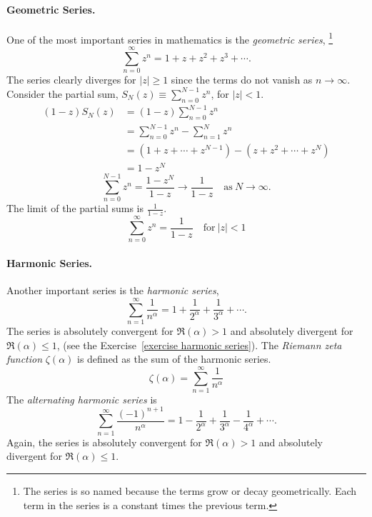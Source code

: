 \paragraph{Geometric Series.}
One of the most important series in mathematics is the 
\textit{geometric series},
\footnote{
  The series is so named because the terms grow or decay geometrically.  
  Each term in the series is a constant times the previous term.
  }
\[ 
\sum_{n = 0}^\infty z^n = 1 + z + z^2 + z^3 + \cdots.
\]
The series clearly diverges for $|z| \geq 1$ since the terms do not vanish
as $n \to \infty$.  Consider the partial sum,
$S_N(z) \equiv \sum_{n=0}^{N-1} z^n$, for $|z| < 1$.
\begin{align*}
  (1 - z) S_N(z) &= (1-z) \sum_{n=0}^{N-1} z^n 
  \\
  &= \sum_{n=0}^{N-1} z^n - \sum_{n=1}^{N} z^n 
  \\
  &= \left( 1 + z + \cdots + z^{N-1} \right) - \left( z + z^2 + \cdots + z^N \right) 
  \\
  &= 1 - z^N
\end{align*}
\[ 
\sum_{n=0}^{N-1} z^n = \frac{1 - z^N}{1-z} \to \frac{1}{1 - z} \quad \mathrm{as}\ N \to \infty.
\]
The limit of the partial sums is $\frac{1}{1-z}$.
\[ 
\sum_{n = 0}^\infty z^n = \frac{1}{1-z} \quad \mathrm{for}\ |z| < 1
\]





\paragraph{Harmonic Series.}
Another important series is the \textit{harmonic series}, 
\[ 
\sum_{n=1}^\infty \frac{1}{n^\alpha} = 1 + \frac{1}{2^\alpha} + \frac{1}{3^\alpha} + \cdots.
\]
The series is absolutely convergent for $\Re(\alpha) > 1$ and absolutely divergent
for $\Re(\alpha) \leq 1$, (see the Exercise~\ref{exercise harmonic series}).  The 
\textit{Riemann zeta function} $\zeta(\alpha)$ is 
defined as the sum of the harmonic series.
\[ 
\zeta(\alpha) = \sum_{n=1}^\infty \frac{1}{n^\alpha} 
\]
The \textit{alternating harmonic series} is
\[ 
\sum_{n=1}^\infty \frac{(-1)^{n+1}}{n^\alpha} = 1 - \frac{1}{2^\alpha} + \frac{1}{3^\alpha} - \frac{1}{4^\alpha} +  \cdots.
\]
Again, the series is absolutely convergent for $\Re(\alpha) > 1$
and absolutely divergent for $\Re(\alpha) \leq 1$.  






